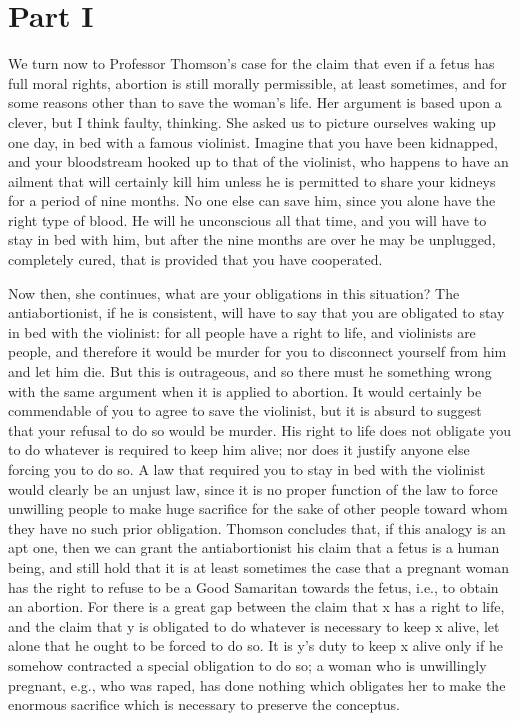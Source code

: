 \section{Part I}

We turn now to Professor Thomson’s case for the claim
that even if a fetus has full moral rights, abortion is still
morally permissible, at least sometimes, and for some
reasons other than to save the woman’s life. Her argument
is based upon a clever, but I think faulty, thinking. She
asked us to picture ourselves waking up one day, in bed
with a famous violinist. Imagine that you have been
kidnapped, and your bloodstream hooked up to that of the
violinist, who happens to have an ailment that will
certainly kill him unless he is permitted to share your
kidneys for a period of nine months. No one else can save
him, since you alone have the right type of blood. He will
he unconscious all that time, and you will have to stay in
bed with him, but after the nine months are over he may
be unplugged, completely cured, that is provided that you
have cooperated.

Now then, she continues, what are your obligations in this
situation? The antiabortionist, if he is consistent, will have
to say that you are obligated to stay in bed with the
violinist: for all people have a right to life, and violinists
are people, and therefore it would be murder for you to
disconnect yourself from him and let him die.\autocite{Thomson1} But this is
outrageous, and so there must he something wrong with
the same argument when it is applied to abortion. It would
certainly be commendable of you to agree to save the
violinist, but it is absurd to suggest that your refusal to do
so would be murder. His right to life does not obligate
you to do whatever is required to keep him alive; nor does
it justify anyone else forcing you to do so. A law that
required you to stay in bed with the violinist would
clearly be an unjust law, since it is no proper function of
the law to force unwilling people to make huge sacrifice
for the sake of other people toward whom they have no
such prior obligation. Thomson concludes that, if this
analogy is an apt one, then we can grant the
antiabortionist his claim that a fetus is a human being, and
still hold that it is at least sometimes the case that a
pregnant woman has the right to refuse to be a Good
Samaritan towards the fetus, i.e., to obtain an abortion.
For there is a great gap between the claim that x has a
right to life, and the claim that y is obligated to do
whatever is necessary to keep x alive, let alone that he
ought to be forced to do so. It is y’s duty to keep x alive
only if he somehow contracted a special obligation to do
so; a woman who is unwillingly pregnant, e.g., who was
raped, has done nothing which obligates her to make the
enormous sacrifice which is necessary to preserve the
conceptus.

